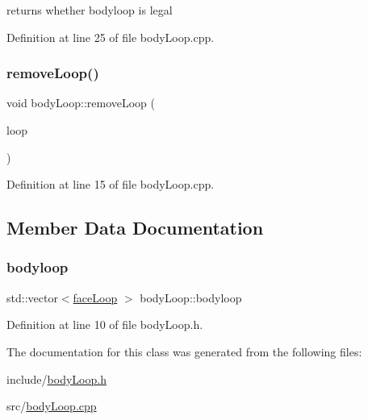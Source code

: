 returns whether bodyloop is legal 

Definition at line 25 of file body\+Loop.\+cpp.

\mbox{\label{classbody_loop_a963bee3f5118c89183c4eedaa39c3641}} 
\subsubsection{\texorpdfstring{remove\+Loop()}{removeLoop()}}
{\footnotesize\ttfamily void body\+Loop\+::remove\+Loop (\begin{DoxyParamCaption}\item[{\mbox{\hyperlink{classface_loop}{face\+Loop}}}]{loop }\end{DoxyParamCaption})}



Definition at line 15 of file body\+Loop.\+cpp.



\subsection{Member Data Documentation}
\mbox{\label{classbody_loop_a44aae842c31a2872e898ee26eaa7cb52}} 
\subsubsection{\texorpdfstring{bodyloop}{bodyloop}}
{\footnotesize\ttfamily std\+::vector$<$\mbox{\hyperlink{classface_loop}{face\+Loop}} $>$ body\+Loop\+::bodyloop}



Definition at line 10 of file body\+Loop.\+h.



The documentation for this class was generated from the following files\+:\begin{DoxyCompactItemize}
\item 
include/\mbox{\hyperlink{body_loop_8h}{body\+Loop.\+h}}\item 
src/\mbox{\hyperlink{body_loop_8cpp}{body\+Loop.\+cpp}}\end{DoxyCompactItemize}
